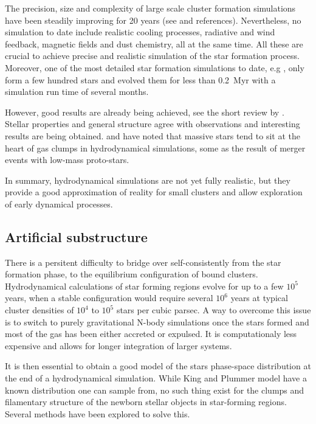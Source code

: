 The precision, size and complexity of large scale cluster formation simulations have been steadily improving for 20 years (see \citealt{Turner1995,Klessen2000,Bate2003,Offner2009,Myers2014} and references). Nevertheless, no simulation to date include realistic cooling processes, radiative and wind feedback, magnetic fields and dust chemistry, all at the same time. All these are crucial to achieve precise and realistic simulation of the star formation process. Moreover, one of the most detailed star formation simulations to date, e.g \cite{Bate2012}, only form a few hundred stars and evolved them for less than 0.2~Myr with a simulation run time of several months.

However, good results are already being achieved, see the short review by \cite{Clarke2012}. Stellar properties and general structure agree with observations and interesting results are being obtained. \cite{Maschberger2011} and \cite{Moeckel2011} have noted that massive stars tend to sit at the heart of gas clumps in hydrodynamical simulations, some as the result of merger events with low-mass proto-stars. 

In summary, hydrodynamical simulations are not yet fully realistic, but they provide a good approximation of reality for small clusters and allow exploration of early dynamical processes.


\subsection{Artificial substructure}

There is a persitent difficulty to bridge over self-consistently from the star formation phase, to the equilibrium configuration of bound clusters. Hydrodynamical calculations of star forming regions evolve for  up to a few $10^5$ years, when a stable configuration would require several $10^6$ years at typical cluster densities of $10^4$ to $10^5$ stars per cubic parsec. A way to overcome this issue is to switch to purely gravitational N-body simulations once the stars formed and most of the gas has been either accreted or expulsed. It is computationaly less expensive and allows for longer integration of larger systems.

It is then essential to obtain a good model of the stars phase-space distribution at the end of a hydrodynamical simulation. While King and Plummer model have a known distribution one can sample from, no such thing exist for the clumps and filamentary structure of the newborn stellar objects in star-forming regions. Several methods have been explored to solve this.



